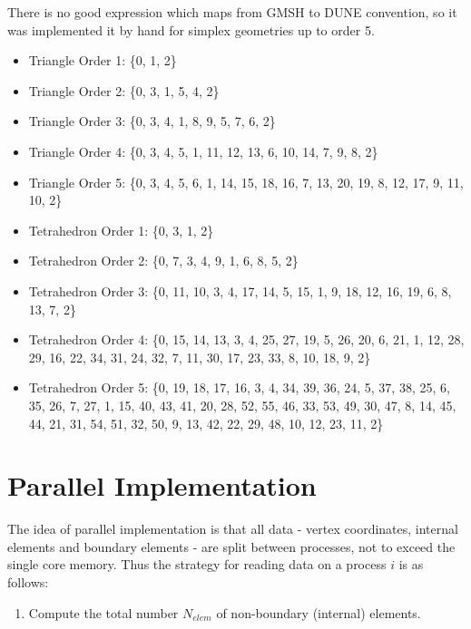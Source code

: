 \documentclass[12pt]{article}
\begin{document}
\noindent
There is no good expression which maps from GMSH to DUNE convention, so it was implemented it by hand for simplex geometries up to order 5.
\begin{itemize}
	\item Triangle Order 1: \{0, 1, 2\}
	\item Triangle Order 2: \{0, 3, 1, 5, 4, 2\}
	\item Triangle Order 3: \{0, 3, 4, 1, 8, 9, 5, 7, 6, 2\}
	\item Triangle Order 4: \{0, 3, 4, 5, 1, 11, 12, 13, 6, 10, 14, 7, 9, 8, 2\}
	\item Triangle Order 5: \{0, 3, 4, 5, 6, 1, 14, 15, 18, 16, 7, 13, 20, 19, 8, 12, 17, 9, 11, 10, 2\}
	
	\item Tetrahedron Order 1: \{0, 3, 1, 2\}
	\item Tetrahedron Order 2: \{0, 7, 3, 4, 9, 1, 6, 8, 5, 2\}
	\item Tetrahedron Order 3: \{0, 11, 10, 3, 4, 17, 14, 5, 15, 1, 9, 18, 12, 16, 19, 6, 8, 13, 7, 2\}
	\item Tetrahedron Order 4: \{0, 15, 14, 13, 3, 4, 25, 27, 19, 5, 26, 20, 6, 21, 1, 12, 28, 29, 16, 22, 34, 31, 24, 32, 7, 11, 30, 17, 23, 33, 8, 10, 18, 9, 2\}
	\item Tetrahedron Order 5: \{0, 19, 18, 17, 16, 3, 4, 34, 39, 36, 24, 5, 37, 38, 25, 6, 35, 26, 7, 27, 1, 15, 40, 43, 41, 20, 28, 52, 55, 46, 33, 53, 49, 30, 47, 8, 14, 45, 44, 21, 31, 54, 51, 32, 50, 9, 13, 42, 22, 29, 48, 10, 12, 23, 11, 2\}
\end{itemize}












\section{Parallel Implementation}

The idea of parallel implementation is that all data - vertex coordinates, internal elements and boundary elements - are split between processes, not to exceed the single core memory. Thus the strategy for reading data on a process $i$ is as follows:
\begin{enumerate}
	\item Compute the total number $N_{elem}$ of non-boundary (internal) elements.
\end{enumerate}
\end{document}
